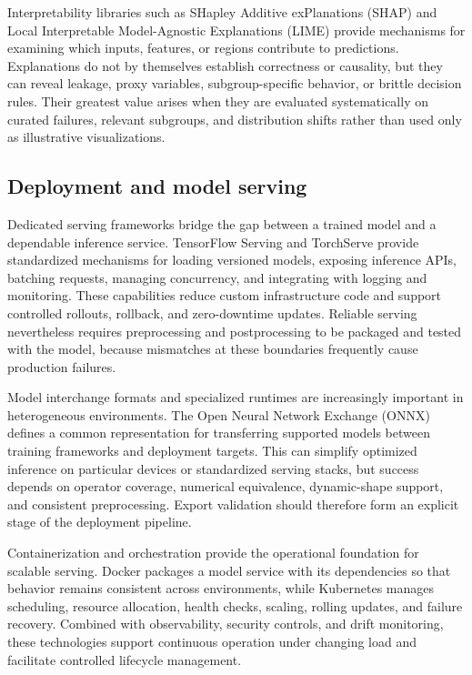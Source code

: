 \documentclass{article}
\begin{document}
Interpretability libraries such as SHapley Additive exPlanations (SHAP) and Local Interpretable Model-Agnostic Explanations (LIME) provide mechanisms for examining which inputs, features, or regions contribute to predictions. Explanations do not by themselves establish correctness or causality, but they can reveal leakage, proxy variables, subgroup-specific behavior, or brittle decision rules. Their greatest value arises when they are evaluated systematically on curated failures, relevant subgroups, and distribution shifts rather than used only as illustrative visualizations.


\subsection{Deployment and model serving}

Dedicated serving frameworks bridge the gap between a trained model and a dependable inference service. TensorFlow Serving and TorchServe provide standardized mechanisms for loading versioned models, exposing inference APIs, batching requests, managing concurrency, and integrating with logging and monitoring. These capabilities reduce custom infrastructure code and support controlled rollouts, rollback, and zero-downtime updates. Reliable serving nevertheless requires preprocessing and postprocessing to be packaged and tested with the model, because mismatches at these boundaries frequently cause production failures.

Model interchange formats and specialized runtimes are increasingly important in heterogeneous environments. The Open Neural Network Exchange (ONNX) defines a common representation for transferring supported models between training frameworks and deployment targets. This can simplify optimized inference on particular devices or standardized serving stacks, but success depends on operator coverage, numerical equivalence, dynamic-shape support, and consistent preprocessing. Export validation should therefore form an explicit stage of the deployment pipeline.

Containerization and orchestration provide the operational foundation for scalable serving. Docker packages a model service with its dependencies so that behavior remains consistent across environments, while Kubernetes manages scheduling, resource allocation, health checks, scaling, rolling updates, and failure recovery. Combined with observability, security controls, and drift monitoring, these technologies support continuous operation under changing load and facilitate controlled lifecycle management.
\end{document}
